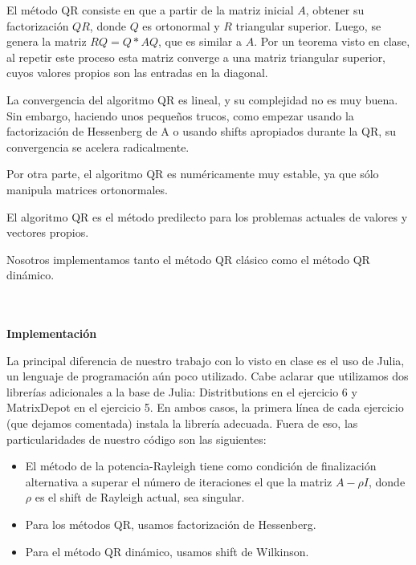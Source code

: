 \documentclass[11pt]{article}
\begin{document}
El método QR consiste en que a partir de la matriz inicial $A$, obtener su factorización $QR$, donde $Q$ es ortonormal y $R$ triangular superior. Luego, se genera la matriz $RQ=Q*AQ$, que es similar a $A$. Por un teorema visto en clase, al repetir este proceso esta matriz converge a una matriz triangular superior, cuyos valores propios son las entradas en la diagonal.



La convergencia del algoritmo QR es lineal, y su complejidad no es muy buena. Sin embargo, haciendo unos pequeños trucos, como empezar usando la factorización de Hessenberg de A o usando shifts apropiados durante la QR, su convergencia se acelera radicalmente.



Por otra parte, el algoritmo QR es numéricamente muy estable, ya que sólo manipula matrices ortonormales.



El algoritmo QR es el método predilecto para los problemas actuales de valores y vectores propios.



Nosotros implementamos tanto el método QR clásico como el método QR dinámico.


\\
\\
\noindent
\textbf{\LARGE{Implementación}}

\noindent
La principal diferencia de nuestro trabajo con lo visto en clase es el uso de Julia,
un lenguaje de programación aún poco utilizado. Cabe aclarar que utilizamos dos
librerías adicionales a la base de Julia: Distritbutions en el ejercicio 6 y
MatrixDepot en el ejercicio 5. En ambos casos, la primera línea de cada ejercicio
(que dejamos comentada) instala la librería adecuada.
Fuera de eso, las particularidades de nuestro código son las siguientes:

\begin{itemize}
	\item El método de la potencia-Rayleigh tiene como condición de finalización alternativa a superar el número de iteraciones el que la matriz $A-\rho I$, donde $\rho$ es el shift de Rayleigh actual, sea singular.
	\item Para los métodos QR, usamos factorización de Hessenberg.
	\item Para el método QR dinámico, usamos shift de Wilkinson.

\end{itemize}
\end{document}
